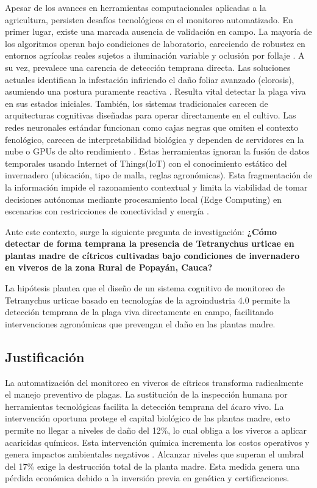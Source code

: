 \documentclass[12pt,letterpaper]{article}
\begin{document}
Apesar de los avances en herramientas computacionales aplicadas a la  agricultura, persisten desafíos tecnológicos en el monitoreo automatizado. En primer lugar, existe una marcada ausencia de validación en campo. La mayoría de los algoritmos operan bajo condiciones de laboratorio, careciendo de robustez en entornos agrícolas reales sujetos a iluminación variable y oclusión por follaje \cite{jelali2024}. A su vez, prevalece una carencia de detección temprana directa. Las soluciones actuales identifican la infestación infiriendo el daño foliar avanzado (clorosis), asumiendo una postura puramente reactiva \cite{nieuwenhuizen2020}. Resulta vital detectar la plaga viva en sus estados iniciales. También, los sistemas tradicionales carecen de arquitecturas cognitivas diseñadas para operar directamente en el cultivo. Las redes neuronales estándar funcionan como cajas negras que omiten el contexto fenológico, carecen de interpretabilidad biológica \cite{ilodibe2026thrips} y dependen de servidores en la nube o GPUs de alto rendimiento \cite{zhou2023}. Estas herramientas ignoran la fusión de datos temporales usando Internet of Things(IoT) con el conocimiento estático del invernadero (ubicación, tipo de malla, reglas agronómicas). Esta fragmentación de la información impide el razonamiento contextual y limita la viabilidad de tomar decisiones autónomas mediante procesamiento local (Edge Computing) en escenarios con restricciones de conectividad y energía \cite{umar2024ontology}.

Ante este contexto, surge la siguiente pregunta de investigación: \textbf{¿Cómo detectar de forma temprana la presencia de Tetranychus urticae en plantas madre de cítricos cultivadas bajo condiciones de invernadero en viveros de la zona Rural de Popayán, Cauca?}

La hipótesis plantea que el diseño de un sistema cognitivo de monitoreo de Tetranychus urticae basado en tecnologías de la agroindustria 4.0 permite la detección temprana de la plaga viva directamente en campo, facilitando intervenciones agronómicas que
prevengan el daño en las plantas madre.

\subsection{Justificación}

La automatización del monitoreo en viveros de cítricos transforma radicalmente el manejo preventivo de plagas. La sustitución de la inspección humana por herramientas tecnológicas facilita la detección temprana del ácaro vivo. La intervención oportuna protege el capital biológico de las plantas madre, esto permite no llegar a niveles de daño del 12\%, lo cual obliga a los viveros a aplicar acaricidas químicos. Esta intervención química incrementa los costos operativos y genera impactos ambientales negativos \cite{dimasi_inta}. Alcanzar niveles que superan el umbral del 17\% exige la destrucción total de la planta madre. Esta medida genera una pérdida económica debido a la inversión previa en genética y certificaciones.
\end{document}
